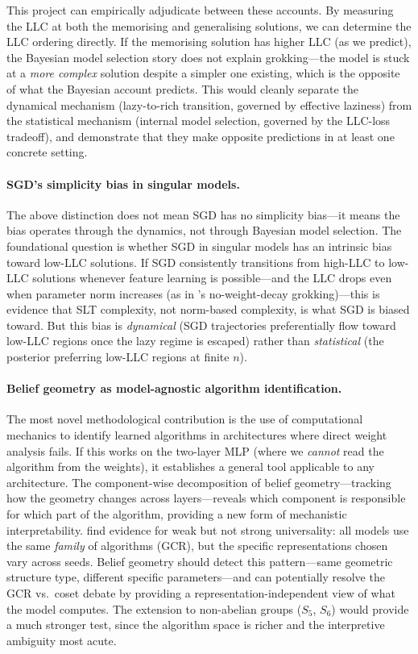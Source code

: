 \documentclass[11pt,a4paper]{article}
\begin{document}
This project can empirically adjudicate between these accounts. By measuring the LLC at both the memorising and generalising solutions, we can determine the LLC ordering directly. If the memorising solution has higher LLC (as we predict), the Bayesian model selection story does not explain grokking---the model is stuck at a \emph{more complex} solution despite a simpler one existing, which is the opposite of what the Bayesian account predicts. This would cleanly separate the dynamical mechanism (lazy-to-rich transition, governed by effective laziness) from the statistical mechanism (internal model selection, governed by the LLC-loss tradeoff), and demonstrate that they make opposite predictions in at least one concrete setting.

\paragraph{SGD's simplicity bias in singular models.} The above distinction does not mean SGD has no simplicity bias---it means the bias operates through the dynamics, not through Bayesian model selection. The foundational question is whether SGD in singular models has an intrinsic bias toward low-LLC solutions. If SGD consistently transitions from high-LLC to low-LLC solutions whenever feature learning is possible---and the LLC drops even when parameter norm increases (as in \citeauthor{kumar2024grokking}'s no-weight-decay grokking)---this is evidence that SLT complexity, not norm-based complexity, is what SGD is biased toward. But this bias is \emph{dynamical} (SGD trajectories preferentially flow toward low-LLC regions once the lazy regime is escaped) rather than \emph{statistical} (the posterior preferring low-LLC regions at finite $n$).

\paragraph{Belief geometry as model-agnostic algorithm identification.} The most novel methodological contribution is the use of computational mechanics to identify learned algorithms in architectures where direct weight analysis fails. If this works on the two-layer MLP (where we \emph{cannot} read the algorithm from the weights), it establishes a general tool applicable to any architecture. The component-wise decomposition of belief geometry---tracking how the geometry changes across layers---reveals which component is responsible for which part of the algorithm, providing a new form of mechanistic interpretability. \citet{chughtai2023toy} find evidence for weak but not strong universality: all models use the same \emph{family} of algorithms (GCR), but the specific representations chosen vary across seeds. Belief geometry should detect this pattern---same geometric structure type, different specific parameters---and can potentially resolve the GCR vs.\ coset debate by providing a representation-independent view of what the model computes. The extension to non-abelian groups ($S_5$, $S_6$) would provide a much stronger test, since the algorithm space is richer and the interpretive ambiguity most acute.
\end{document}
